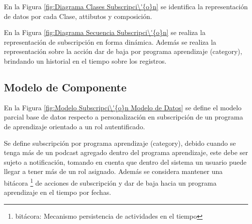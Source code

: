 En la Figura \ref{fig:Diagrama Clases Subscripci\'{o}n} se identifica la
representaci\'{o}n de datos por cada Clase, attibutos y composici\'{o}n.

\begin{minipage}{1.0\textwidth}
	\centering
	\label{fig:Diagrama Clases Subscripci\'{o}n}
\end{minipage}

En la Figura \ref{fig:Diagrama Secuencia Subscripci\'{o}n} se realiza la
representaci\'{o}n de subscripci\'{o}n en forma din\'{a}mica. Adem\'{a}s se 
realiza la representaci\'{o}n sobre la acci\'{o}n dar de baja por programa
aprendizaje (category), brindando un historial en el tiempo sobre los registros. 

\begin{minipage}{1.0\textwidth}
\centering
{}
\label{fig:Diagrama Secuencia Subscripci\'{o}n}
\end{minipage}

\subsection{Modelo de Componente}

En la Figura \ref{fig:Modelo Subscripci\'{o}n Modelo de Datos} se define el 
modelo parcial base de datos respecto a personalizaci\'{o}n en subscripci\'{o}n
de un programa de aprendizaje orientado a un rol autentificado. 

\begin{minipage}{1.0\textwidth}
	\centering
	\label{fig:Modelo Subscripci\'{o}n Modelo de Datos}
\end{minipage}

Se define subscripci\'{o}n por programa aprendizaje (category), debido cuando se
tenga m\'{a}s de un podcast agregado dentro del programa aprendizaje, este debe
ser sujeto a notificaci\'{o}n, tomando en cuenta que dentro del sistema un 
usuario puede llegar a tener m\'{a}s de un rol asignado. Adem\'{a}s se considera
mantener una bit\'{a}cora \footnote{bit\'{a}cora: Mecanismo persistencia de actividades
en el tiempo} de acciones de subscripci\'{o}n y dar de baja hacia un programa 
aprendizaje en el tiempo por fechas.

